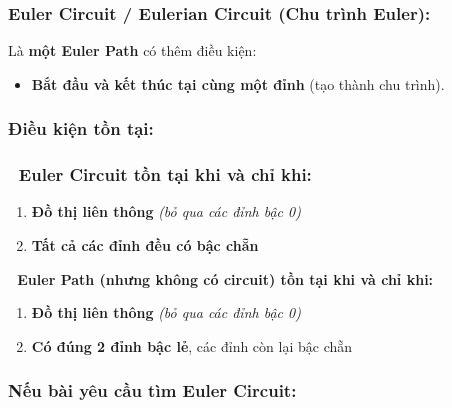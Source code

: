 \documentclass[11pt,a4paper]{article}
\begin{document}
\Needspace{70.0pt}

\subsubsection{Euler Circuit / Eulerian Circuit (Chu trình Euler):}

Là \textbf{một Euler Path} có thêm điều kiện:

\begin{itemize}
\item
  \textbf{Bắt đầu và kết thúc tại cùng một đỉnh} (tạo thành chu trình).
\end{itemize}

\Needspace{70.0pt}

\subsubsection{\texorpdfstring{\textbf{Điều kiện tồn tại:}}{Điều kiện tồn tại:}}

\Needspace{70.0pt}

\subsubsection{\texorpdfstring{\textbf{🔹 Euler Circuit tồn tại khi và chỉ khi:}}{🔹 Euler Circuit tồn tại khi và chỉ khi:}}

\begin{enumerate}
\def\labelenumi{\arabic{enumi}.}
\item
  \textbf{Đồ thị liên thông} \emph{(bỏ qua các đỉnh bậc 0) }
\item
  \textbf{Tất cả các đỉnh đều có bậc chẵn}
\end{enumerate}

\textbf{🔹 Euler Path (nhưng không có circuit) tồn tại khi và chỉ khi:}

\begin{enumerate}
\def\labelenumi{\arabic{enumi}.}
\item
  \textbf{Đồ thị liên thông} \emph{(bỏ qua các đỉnh bậc 0) }
\item
  \textbf{Có đúng 2 đỉnh bậc lẻ}, các đỉnh còn lại bậc chẵn
\end{enumerate}

\Needspace{70.0pt}

\subsubsection{\texorpdfstring{\textbf{Nếu bài yêu cầu tìm Euler Circuit:}}{Nếu bài yêu cầu tìm Euler Circuit:}}
\end{document}
